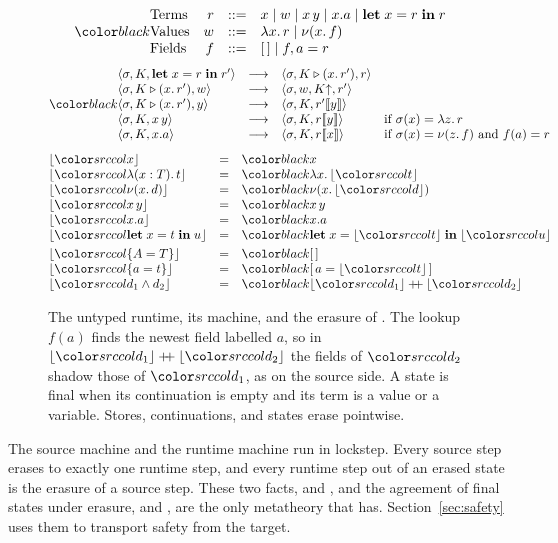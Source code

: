 \begin{figure}
\small
\mathplain
\[
\run{\begin{array}{@{}lrcl@{}}
\text{Terms} & r & ::= & x \mid w \mid x\,y \mid x.a \mid \klet x = r \kin r \\
\text{Values} & w & ::= & \lambda x.\,r \mid \nu(x.\,f) \\
\text{Fields} & f & ::= & \tnil \mid f, a = r
\end{array}}
\]
\[
\run{\begin{array}{@{}lcll@{}}
\mst{\sigma}{K}{\klet x = r \kin r'} &\step& \mst{\sigma}{K \triangleright (x.\,r')}{r} \\
\mst{\sigma}{K \triangleright (x.\,r')}{w} &\step& \mst{\sigma, w}{\weak{K}}{r'} \\
\mst{\sigma}{K \triangleright (x.\,r')}{y} &\step& \mst{\sigma}{K}{\inst{r'}{y}} \\
\mst{\sigma}{K}{x\,y} &\step& \mst{\sigma}{K}{\inst{r}{y}} & \text{if } \sigma(x) = \lambda z.\,r \\
\mst{\sigma}{K}{x.a} &\step& \mst{\sigma}{K}{\inst{r}{x}} & \text{if } \sigma(x) = \nu(z.\,f) \text{ and } f(a) = r
\end{array}}
\]
\[
\begin{array}{@{}lcl@{}}
\erase{\src{x}} & = & \run{x} \\
\erase{\src{\lambda(x : T).\,t}} & = & \run{\lambda x.\,\erase{\src{t}}} \\
\erase{\dnew{x}{d}} & = & \run{\nu(x.\,\erase{\src{d}})} \\
\erase{\src{x\,y}} & = & \run{x\,y} \\
\erase{\src{x.a}} & = & \run{x.a} \\
\erase{\src{\klet x = t \kin u}} & = & \run{\klet x = \erase{\src{t}} \kin \erase{\src{u}}} \\[3pt]
\erase{\ddeftyp{A}{T}} & = & \run{\tnil} \\
\erase{\ddeftrm{a}{t}} & = & \run{[\,a = \erase{\src{t}}\,]} \\
\erase{\src{d_1 \wedge d_2}} & = & \run{\erase{\src{d_1}} \mathbin{+\!\!+} \erase{\src{d_2}}}
\end{array}
\]
\caption{The untyped runtime, its machine, and the erasure of \DOTMNF. The lookup $f(a)$ finds the newest field labelled $a$, so in $\erase{\src{d_1}} \mathbin{+\!\!+} \erase{\src{d_2}}$ the fields of $\src{d_2}$ shadow those of $\src{d_1}$, as on the source side. A state is final when its continuation is empty and its term is a value or a variable. Stores, continuations, and states erase pointwise.}
\label{fig:runtime}
\end{figure}

The source machine and the runtime machine run in lockstep. Every source step erases to exactly one runtime step, and every runtime step out of an erased state is the erasure of a source step. These two facts,  and , and the agreement of final states under erasure,  and , are the only metatheory that \DOTMNF has. Section~\ref{sec:safety} uses them to transport safety from the target.
